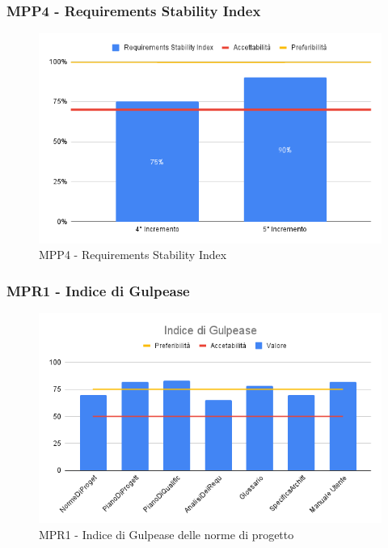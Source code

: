 \subsubsection{MPP4 - Requirements Stability Index}

\begin{figure}[H]
	\centering
	\includegraphics[scale = 0.6]{sezioni/Images/PB/RequirementsStabilityIndex.png}
	\caption{MPP4 - Requirements Stability Index}
\end{figure}

\subsubsection{MPR1 - Indice di Gulpease}

\begin{figure}[H]
	\centering
	\includegraphics[scale = 0.6]{sezioni/Images/PB/GulpeaseGenerale.png}
	\caption{MPR1 - Indice di Gulpease delle norme di progetto}
\end{figure}

